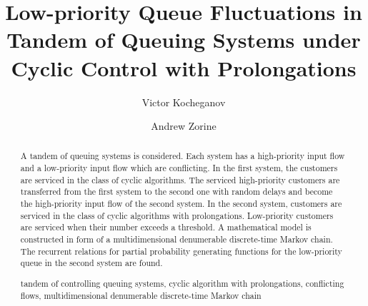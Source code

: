 \documentclass[runningheads,a4paper]{llncs}
\newcommand{\keywords}[1]{\par\addvspace\baselineskip
\noindent\keywordname\enspace\ignorespaces#1}
\begin{document}
\mainmatter  %

\title{Low-priority Queue Fluctuations in Tandem of Queuing Systems under Cyclic Control with Prolongations}


%
%
\author{Victor Kocheganov \and Andrew Zorine}
%


%
%

\maketitle


\begin{abstract}
A tandem of queuing systems is considered. Each system has a high-priority input flow and a low-priority input flow which are conflicting. In the first system, the customers are serviced in the class of cyclic algorithms. The serviced high-priority customers are transferred from the first system to the second one  with random delays and become the high-priority input flow of the second system. In the second system, customers are serviced in the class of cyclic algorithms with prolongations. Low-priority customers are serviced when their number exceeds a threshold. A mathematical model is constructed in form of a multidimensional denumerable discrete-time Markov chain. The recurrent relations for partial probability generating functions for the low-priority queue in the second system are found.
\keywords{tandem of controlling queuing systems, cyclic algorithm with prolongations, conflicting flows, multidimensional denumerable discrete-time Markov chain}
\end{abstract}
\end{document}
